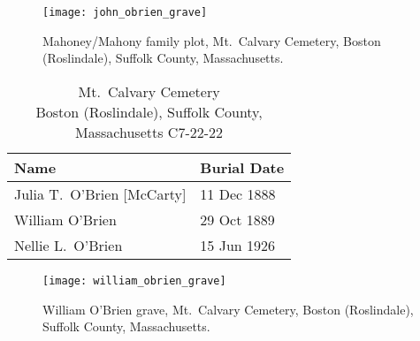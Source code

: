 \begin{figure}
	\centering
	\texttt{[image: john\_obrien\_grave]}
	\caption{Mahoney/Mahony family plot, Mt.\ Calvary Cemetery, Boston (Roslindale), Suffolk County, Massachusetts.}
	\label{fig:MahoneyPlot}
\end{figure}

\begin{table}[ht]
	\centering
	\caption{Mt.\ Calvary Cemetery\cite{William3OBrienBurial} \\
		Boston (Roslindale), Suffolk County, Massachusetts
		C7-22-22}
	\begin{tabular}{|l|l|}
		\hline
		\textbf{Name} & \textbf{Burial Date} \\
		\hline
		Julia T.\ O'Brien [McCarty]\index{McCarty!Julia T.}\index{O'Brien!Julia T.\ (McCarty)} & 11 Dec 1888 \\
		\hline
		William O'Brien\index{O'Brien!William\textsuperscript{3}} & 29 Oct 1889 \\
		\hline
		Nellie L.\ O'Brien\index{O'Brien!Ellen/Nellie Louise\textsuperscript{4}} & 15 Jun 1926 \\
		\hline
	\end{tabular}
\end{table}

\begin{figure}
	\centering
	\texttt{[image: william\_obrien\_grave]}
	\caption{William O'Brien grave, Mt.\ Calvary Cemetery, Boston (Roslindale), Suffolk County, Massachusetts.}
	\label{fig:WilliamOBrienGrave}
\end{figure}
